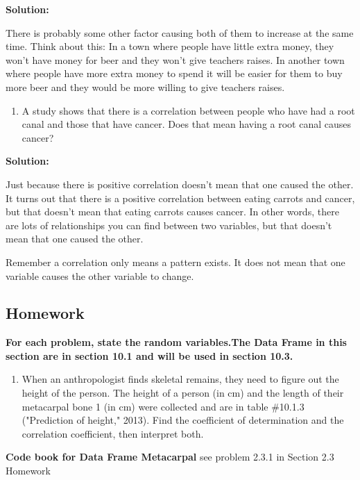 \documentclass[
]{book}
\providecommand{\tightlist}{%
  \setlength{\itemsep}{0pt}\setlength{\parskip}{0pt}}
\begin{document}
\textbf{Solution:}

There is probably some other factor causing both of them to increase at the same time. Think about this: In a town where people have little extra money, they won't have money for beer and they won't give teachers raises. In another town where people have more extra money to spend it will be easier for them to buy more beer and they would be more willing to give teachers raises.

\begin{enumerate}
\def\labelenumi{\alph{enumi}.}
\setcounter{enumi}{1}
\tightlist
\item
  A study shows that there is a correlation between people who have had a root canal and those that have cancer. Does that mean having a root canal causes cancer?
\end{enumerate}

\textbf{Solution:}

Just because there is positive correlation doesn't mean that one caused the other. It turns out that there is a positive correlation between eating carrots and cancer, but that doesn't mean that eating carrots causes cancer. In other words, there are lots of relationships you can find between two variables, but that doesn't mean that one caused the other.

Remember a correlation only means a pattern exists. It does not mean that one variable causes the other variable to change.

\hypertarget{homework-26}{%
\subsection{Homework}\label{homework-26}}

\textbf{For each problem, state the random variables.The Data Frame in this section are in section 10.1 and will be used in section 10.3.}

\begin{enumerate}
\def\labelenumi{\arabic{enumi}.}
\tightlist
\item
  When an anthropologist finds skeletal remains, they need to figure out the height of the person. The height of a person (in cm) and the length of their metacarpal bone 1 (in cm) were collected and are in table \#10.1.3 ("Prediction of height," 2013). Find the coefficient of determination and the correlation coefficient, then interpret both.
\end{enumerate}

\textbf{Code book for Data Frame Metacarpal} see problem 2.3.1 in Section 2.3 Homework
\end{document}
